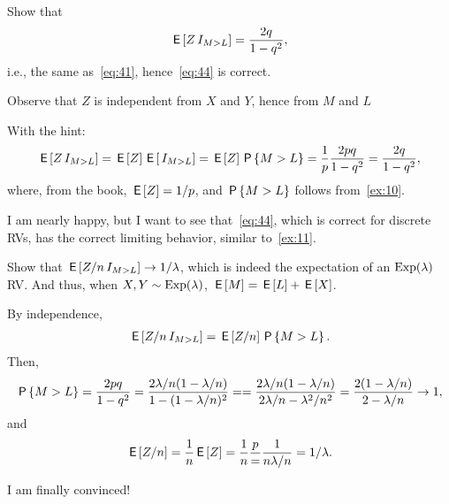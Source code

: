 \documentclass[a4paper,12pt]{article}
\begin{document}
\begin{exercise}
Show that 
\begin{equation}
  \label{eq:45}
\E{Z\1{M>L}} = \frac{2q} {1-q^{2}},
\end{equation}
i.e., the same as~\cref{eq:41}, hence~\cref{eq:44} is correct.
\begin{hint}
Observe that $Z$   is independent from $X$ and $Y$, hence from $M$ and $L$
\end{hint}
\begin{solution} With the hint:
  \begin{align}
    \label{eq:46}
\E{Z\1{M>L}}  = \E Z \E{\1{M>L}} = \E Z \P{M>L} = \frac 1 p \frac{2pq}{1-q^{2}} = \frac{2q}{1-q^{2}},
  \end{align}
where, from the book, $\E Z = 1/p$, and $\P{M>L}$ follows from~\cref{ex:10}. 
\end{solution}
\end{exercise}


I am nearly happy, but I want to see that~\eqref{eq:44}, which is correct for discrete RVs, has the correct limiting behavior, similar to~\cref{ex:11}. 
\begin{exercise}
Show that $\E{Z/n\1{M>L}} \to 1/\lambda$, which is indeed the expectation of an $\Exp{\lambda}$ RV. And thus, when $X,Y\sim \Exp{\lambda}$, $\E M = \E L + \E X$.
\begin{solution}
By independence,
  \begin{align}
    \label{eq:47}
\E{Z/n\1{M>L}} = \E{Z/n} \P{M>L}. 
  \end{align}
Then,
\begin{align}
  \label{eq:49}
\P{M>L}   = \frac{2pq}{1-q^{2}} 
= \frac{2\lambda/n (1-\lambda/n)}{1-(1-\lambda/n)^{2}} = 
= \frac{2\lambda/n (1-\lambda/n)}{2\lambda/n -\lambda^{2}/n^{2}}  
= \frac{2 (1-\lambda/n)}{2 -\lambda/n}  \to 1,
\end{align}
and
\begin{align}
  \label{eq:50}
\E{Z/n} = \frac 1 n \E Z = \frac 1 n \frac p = \frac 1 {n \lambda/ n} = 1/\lambda.
\end{align}
\end{solution}

\end{exercise}

I am finally convinced!




\end{document}
